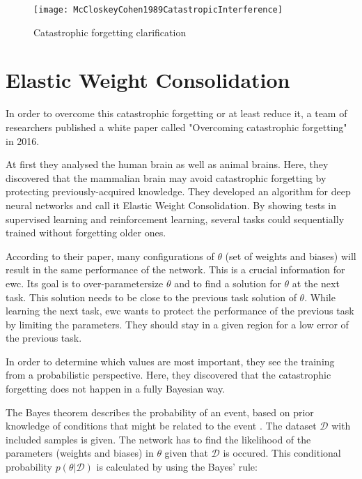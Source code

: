 \begin{figure}[H]
    \centering
    \texttt{[image: McCloskeyCohen1989CatastropicInterference]}
    \caption{\cite[page 148]{psychology_learning_mccloskey_cohen} Catastrophic forgetting clarification}
    \label{fig:catastrophic_forgetting_clarification}
\end{figure}

\section{Elastic Weight Consolidation}
\label{foundation_ewc}

In order to overcome this catastrophic forgetting or at least reduce it, a team of researchers published a white paper called "Overcoming catastrophic forgetting" in 2016.
\cite{elastic-weight-consolidation}

At first they analysed the human brain as well as animal brains.
Here, they discovered that the mammalian brain may avoid catastrophic forgetting by protecting previously-acquired knowledge.
They developed an algorithm for deep neural networks and call it Elastic Weight Consolidation.
By showing tests in supervised learning and reinforcement learning, several tasks could sequentially trained without forgetting older ones.
\cite{elastic-weight-consolidation}

According to their paper, many configurations of $\theta$ (set of weights and biases) will result in the same performance of the network.
This is a crucial information for \acrshort{ewc}.
Its goal is to over-parametersize $\theta$ and to find a solution for $\theta$ at the next task.
This solution needs to be close to the previous task solution of $\theta$.
While learning the next task, \acrshort{ewc} wants to protect the performance of the previous task by limiting the parameters.
They should stay in a given region for a low error of the previous task.
\cite{elastic-weight-consolidation}

In order to determine which values are most important, they see the training from a probabilistic perspective.
Here, they discovered that the catastrophic forgetting does not happen in a fully Bayesian way.
\cite{elastic-weight-consolidation}


The Bayes theorem describes the probability of an event, based on prior knowledge of conditions that might be related to the event \cite{Bayes_theorem}. \cite{elastic-weight-consolidation, schaeffer_ewc}
\newline
The dataset $\mathcal{D}$ with included samples is given.
The network has to find the likelihood of the parameters (weights and biases) in $\theta$ given that $\mathcal{D}$ is occured.
This conditional probability $p \left(\theta | \mathcal{D} \right)$ is calculated by using the Bayes' rule: \cite{elastic-weight-consolidation, schaeffer_ewc}

